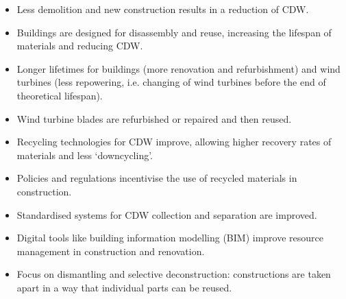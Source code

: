 \begin{itemize}
  \item Less demolition and new construction results in a reduction of CDW.
  \item Buildings are designed for disassembly and reuse, increasing the lifespan of materials and reducing CDW.
  \item Longer lifetimes for buildings (more renovation and refurbishment) and wind turbines (less repowering, i.e. changing of wind turbines before the end of theoretical lifespan).
  \item Wind turbine blades are  refurbished or repaired and then reused.
  \item Recycling technologies for CDW improve, allowing higher recovery rates of materials and less `downcycling'.
  \item Policies and regulations incentivise the use of recycled materials in construction.
  \item Standardised systems for CDW collection and separation are improved.
  \item Digital tools like building information modelling (BIM) improve resource management in construction and renovation.
  \item Focus on dismantling and selective deconstruction: constructions are taken apart in a way that individual parts can be reused.
\end{itemize}


